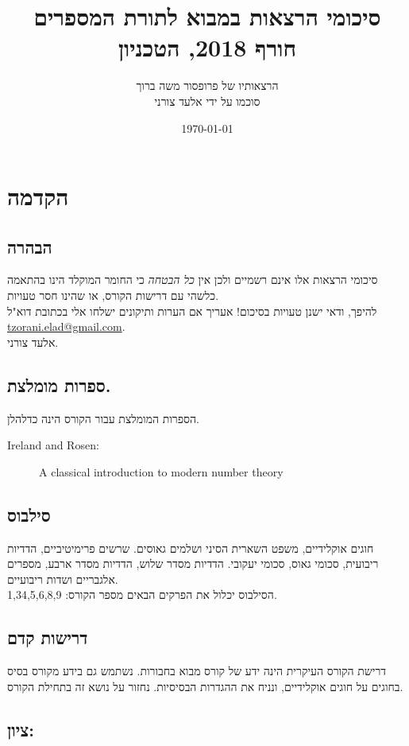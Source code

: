\documentclass[a4paper,10pt,twoside,openany]{book}
\title{סיכומי הרצאות במבוא לתורת המספרים \\ \large{חורף 2018, הטכניון}}
\author{הרצאותיו של פרופסור משה ברוך \\ \large סוכמו על ידי אלעד צורני}
\date{\today}
\begin{document}
\frontmatter
{}
\tableofcontents
\countlectures
\counttutorials
\newpage

\chapter*{הקדמה}

\section*{הבהרה}

סיכומי הרצאות אלו אינם רשמיים ולכן אין
\emph{כל הבטחה}
כי החומר המוקלד הינו בהתאמה כלשהי עם דרישות הקורס, או שהינו חסר טעויות.
\\
להיפך, ודאי ישנן טעויות בסיכום! אעריך אם הערות ותיקונים ישלחו אלי בכתובת דוא"ל
\textenglish{\href{mailto:tzorani.elad@gmail.com}{tzorani.elad@gmail.com}}.\\
אלעד צורני.

\section*{ספרות מומלצת.}

הספרות המומלצת עבור הקורס הינה כדלהלן.

\begin{english}
\begin{description}
\item[Ireland and Rosen:] A classical introduction to modern number theory
\end{description}
\end{english}

\section*{סילבוס}
חוגים אוקלידיים, משפט השארית הסיני ושלמים גאוסים. שרשים פרימיטיביים, הדדיות ריבועית, סכומי גאוס, סכומי יעקובי. הדדיות מסדר שלוש, הדדיות מסדר ארבע, מספרים אלגבריים ושדות ריבועיים.\\
הסילבוס יכלול את הפרקים הבאים מספר הקורס: 1,34,5,6,8,9.

\section*{דרישות קדם}
דרישת הקורס העיקרית הינה ידע של קורס מבוא בחבורות. נשתמש גם בידע מקורס בסיס בחוגים על חוגים אוקלידיים, ונניח את ההגדרות הבסיסיות. נחזור על נושא זה בתחילת הקורס.

\section*{ציון:}
\end{document}
